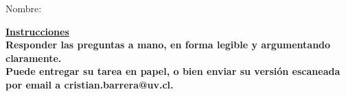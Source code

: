 \documentclass[11pt, letterpaper, addpoints]{exam}
\begin{document}


\vspace{1mm}
\thispagestyle{empty}
Nombre:\enspace\hrulefill
\vspace{5mm}

\centering
\textbf{\underline{Instrucciones}}\\
\vspace{2mm} 
{\small \bfseries 
Responder las preguntas a mano, en forma legible y
argumentando claramente.\\
Puede entregar su tarea en papel, o bien enviar su versión escaneada por email a
cristian.barrera@uv.cl.\\}
\vspace{15mm}

%



%

\end{document}
